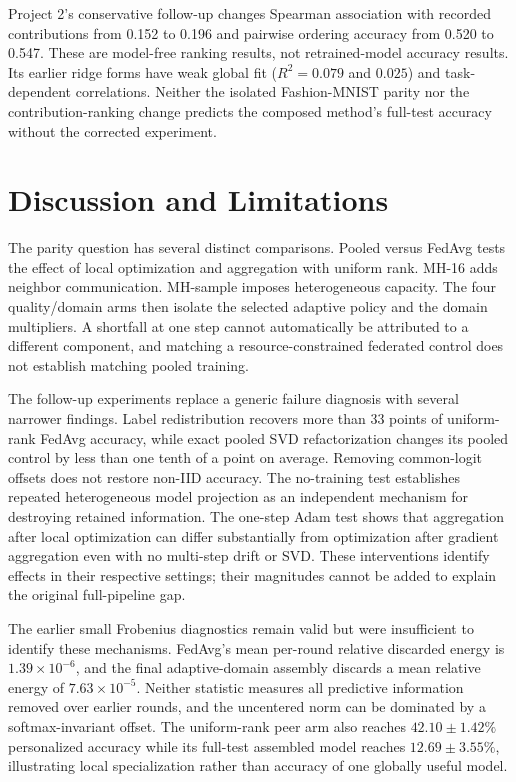 \documentclass[11pt]{article}
\begin{document}
Project 2's conservative follow-up changes Spearman association with recorded contributions from 0.152 to 0.196 and pairwise ordering accuracy from 0.520 to 0.547. These are model-free ranking results, not retrained-model accuracy results. Its earlier ridge forms have weak global fit ($R^2=0.079$ and $0.025$) and task-dependent correlations. Neither the isolated Fashion-MNIST parity nor the contribution-ranking change predicts the composed method's full-test accuracy without the corrected experiment.

\section{Discussion and Limitations}
The parity question has several distinct comparisons. Pooled versus FedAvg tests the effect of local optimization and aggregation with uniform rank. MH-16 adds neighbor communication. MH-sample imposes heterogeneous capacity. The four quality/domain arms then isolate the selected adaptive policy and the domain multipliers. A shortfall at one step cannot automatically be attributed to a different component, and matching a resource-constrained federated control does not establish matching pooled training.

The follow-up experiments replace a generic failure diagnosis with several narrower findings. Label redistribution recovers more than 33 points of uniform-rank FedAvg accuracy, while exact pooled SVD refactorization changes its pooled control by less than one tenth of a point on average. Removing common-logit offsets does not restore non-IID accuracy. The no-training test establishes repeated heterogeneous model projection as an independent mechanism for destroying retained information. The one-step Adam test shows that aggregation after local optimization can differ substantially from optimization after gradient aggregation even with no multi-step drift or SVD. These interventions identify effects in their respective settings; their magnitudes cannot be added to explain the original full-pipeline gap.

The earlier small Frobenius diagnostics remain valid but were insufficient to identify these mechanisms. FedAvg's mean per-round relative discarded energy is $1.39\times10^{-6}$, and the final adaptive-domain assembly discards a mean relative energy of $7.63\times10^{-5}$. Neither statistic measures all predictive information removed over earlier rounds, and the uncentered norm can be dominated by a softmax-invariant offset. The uniform-rank peer arm also reaches $42.10\pm1.42\%$ personalized accuracy while its full-test assembled model reaches $12.69\pm3.55\%$, illustrating local specialization rather than accuracy of one globally useful model.
\end{document}
